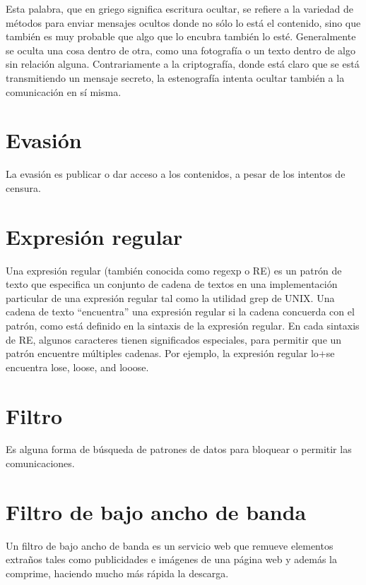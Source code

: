 \documentclass[10pt,a5paper,twoside,,]{book}
\begin{document}
Esta palabra, que en griego significa escritura ocultar, se refiere a la
variedad de métodos para enviar mensajes ocultos donde no sólo lo está
el contenido, sino que también es muy probable que algo que lo encubra
también lo esté. Generalmente se oculta una cosa dentro de otra, como
una fotografía o un texto dentro de algo sin relación alguna.
Contrariamente a la criptografía, donde está claro que se está
transmitiendo un mensaje secreto, la estenografía intenta ocultar
también a la comunicación en sí misma.

\section{Evasión}\label{evasiuxf3n}

La evasión es publicar o dar acceso a los contenidos, a pesar de los
intentos de censura.

\section{Expresión regular}\label{expresiuxf3n-regular}

Una expresión regular (también conocida como regexp o RE) es un patrón
de texto que especifica un conjunto de cadena de textos en una
implementación particular de una expresión regular tal como la utilidad
grep de UNIX. Una cadena de texto ``encuentra'' una expresión regular si
la cadena concuerda con el patrón, como está definido en la sintaxis de
la expresión regular. En cada sintaxis de RE, algunos caracteres tienen
significados especiales, para permitir que un patrón encuentre múltiples
cadenas. Por ejemplo, la expresión regular lo+se encuentra lose, loose,
and looose.

\section{Filtro}\label{filtro}

Es alguna forma de búsqueda de patrones de datos para bloquear o
permitir las comunicaciones.

\section{Filtro de bajo ancho de
banda}\label{filtro-de-bajo-ancho-de-banda}

Un filtro de bajo ancho de banda es un servicio web que remueve
elementos extraños tales como publicidades e imágenes de una página web
y además la comprime, haciendo mucho más rápida la descarga.
\end{document}
